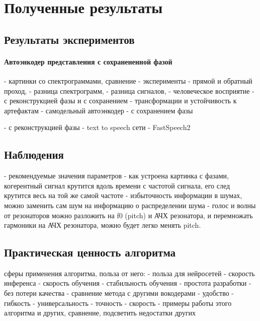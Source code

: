 \chapter{Полученные результаты}

\section{Результаты экспериментов}
\label{sec:sec_3_1}

\subsubsection{Автоэнкодер представления с сохранененной фазой}
\label{subsubsec:keep_phase_net}

\begin{markdown}
  - картинки со спектрограммами, сравнение
  - эксперименты
   - прямой и обратный проход, 
     - разница спектрограмм, 
     - разница сигналов, 
     - человеческое восприятие
     - с реконструкцией фазы и с сохранением
     - трансформации и устойчивость к артефактам
   - самодельный автоэнкодер 
     - с сохранением фазы
     
	 - с реконструкцией фазы
   - text to speech сети
     - FastSpeech2
\end{markdown}

\section{Наблюдения}
\begin{markdown}
  - рекомендуемые значения параметров
  - как устроена картинка с фазами, когерентный сигнал крутится вдоль времени с частотой сигнала, его след крутится весь на той же самой частоте
  - избыточность информации в шумах, можно заменить сам шум на информацию о распределении шума
  - голос и волны от резонаторов можно разложить на f0 (pitch) и АЧХ резонатора, и перемножать гармоники на АЧХ резонатора, можно будет легко менять pitch.
\end{markdown}

\section{Практическая ценность алгоритма}
\begin{markdown}
   сферы применения алгоритма, польза от него:
    - польза для нейросетей
      - скорость инференса
      - скорость обучения
      - стабильность обучения
      - простота разработки
      - без потери качества
  - сравнение метода с другими вокодерами
    - удобство
    - гибкость
    - универсальность
    - точность
    - скорость
  - примеры работы этого алгоритма и других, сравнение, подсветить недостатки других
\end{markdown}


